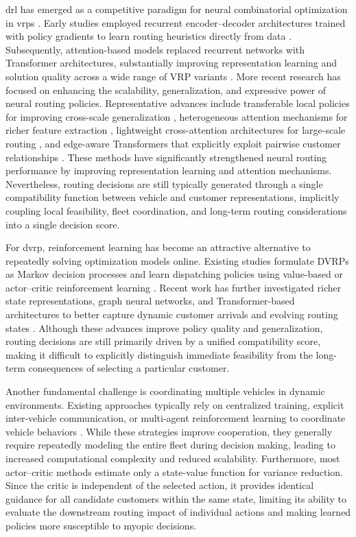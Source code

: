 \documentclass[conference]{IEEEtran}
\begin{document}
\gls{drl} has emerged as a competitive paradigm for neural combinatorial optimization in \gls{vrp}s \cite{nazari2018reinforcement}. Early studies employed recurrent encoder--decoder architectures trained with policy gradients to learn routing heuristics directly from data \cite{nazari2018reinforcement}. Subsequently, attention-based models replaced recurrent networks with Transformer architectures, substantially improving representation learning and solution quality across a wide range of VRP variants \cite{kool2018attention}. More recent research has focused on enhancing the scalability, generalization, and expressive power of neural routing policies. Representative advances include transferable local policies for improving cross-scale generalization \cite{gao2023towards}, heterogeneous attention mechanisms for richer feature extraction \cite{wang2024deep}, lightweight cross-attention architectures for large-scale routing \cite{luo2025boosting}, and edge-aware Transformers that explicitly exploit pairwise customer relationships \cite{meng2025eformer}. These methods have significantly strengthened neural routing performance by improving representation learning and attention mechanisms. Nevertheless, routing decisions are still typically generated through a single compatibility function between vehicle and customer representations, implicitly coupling local feasibility, fleet coordination, and long-term routing considerations into a single decision score.

For \gls{dvrp}, reinforcement learning has become an attractive alternative to repeatedly solving optimization models online. Existing studies formulate DVRPs as Markov decision processes and learn dispatching policies using value-based or actor--critic reinforcement learning \cite{akkerman2025comparison,konovalenko2024optimizing}. Recent work has further investigated richer state representations, graph neural networks, and Transformer-based architectures to better capture dynamic customer arrivals and evolving routing states \cite{konovalenko2024optimizing,li2024cada,meng2025eformer}. Although these advances improve policy quality and generalization, routing decisions are still primarily driven by a unified compatibility score, making it difficult to explicitly distinguish immediate feasibility from the long-term consequences of selecting a particular customer.

Another fundamental challenge is coordinating multiple vehicles in dynamic environments. Existing approaches typically rely on centralized training, explicit inter-vehicle communication, or multi-agent reinforcement learning to coordinate vehicle behaviors \cite{zhang2020multi,shahbazian2025knowledge,xia2025multi}. While these strategies improve cooperation, they generally require repeatedly modeling the entire fleet during decision making, leading to increased computational complexity and reduced scalability. Furthermore, most actor--critic methods estimate only a state-value function for variance reduction. Since the critic is independent of the selected action, it provides identical guidance for all candidate customers within the same state, limiting its ability to evaluate the downstream routing impact of individual actions and making learned policies more susceptible to myopic decisions.
\end{document}
